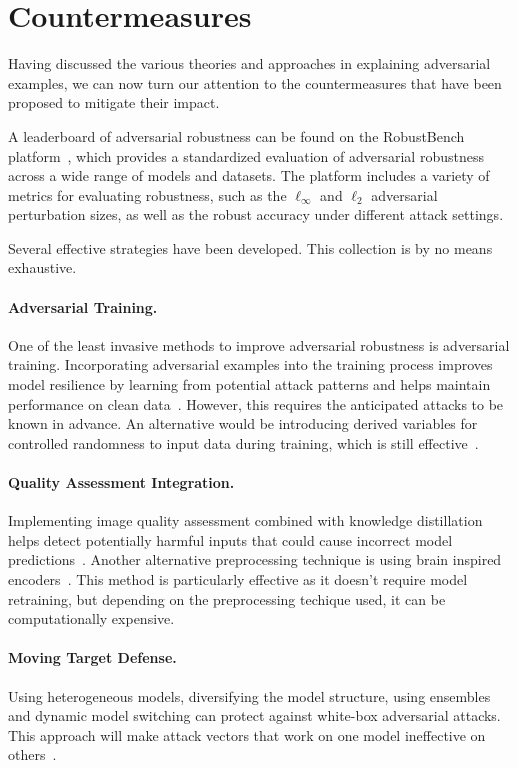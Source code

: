 \documentclass[a4paper, oneside]{discothesis}
\begin{document}
\section{Countermeasures}

Having discussed the various theories and approaches in explaining adversarial examples, we can now turn our attention to the countermeasures that have been proposed to mitigate their impact.

A leaderboard of adversarial robustness can be found on the RobustBench platform~\cite{croce2021robustbench}, which provides a standardized evaluation of adversarial robustness across a wide range of models and datasets. The platform includes a variety of metrics for evaluating robustness, such as the $\ell_\infty$ and $\ell_2$ adversarial perturbation sizes, as well as the robust accuracy under different attack settings.

Several effective strategies have been developed. This collection is by no means exhaustive.

\paragraph{Adversarial Training.} One of the least invasive methods to improve adversarial robustness is adversarial training. Incorporating adversarial examples into the training process improves model resilience by learning from potential attack patterns and helps maintain performance on clean data~\cite{araujo2020advocating, Ren2022VulnerabilityAR}. However, this requires the anticipated attacks to be known in advance. An alternative would be introducing derived variables for controlled randomness to input data during training, which is still effective~\cite{Adeke2023SecuringNT}.

\paragraph{Quality Assessment Integration.} Implementing image quality assessment combined with knowledge distillation helps detect potentially harmful inputs that could cause incorrect model predictions~\cite{feng2020towards}. Another alternative preprocessing technique is using brain inspired encoders~\cite{Rakhimberdina2022StrengtheningRU}. This method is particularly effective as it doesn't require model retraining, but depending on the preprocessing techique used, it can be computationally expensive.

\paragraph{Moving Target Defense.} Using heterogeneous models, diversifying the model structure, using ensembles and dynamic model switching can protect against white-box adversarial attacks. This approach will make attack vectors that work on one model ineffective on others~\cite{Li2023wAdvMTDAM}.
\end{document}
